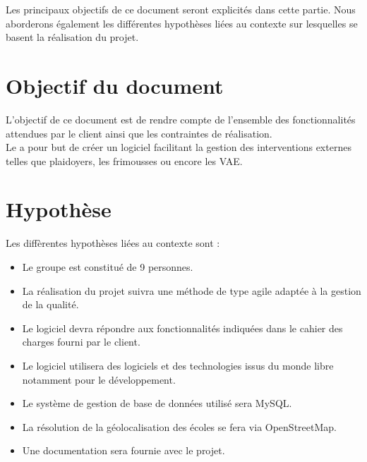 	Les principaux objectifs de ce document seront explicités dans cette partie. Nous aborderons également les différentes hypothèses liées au contexte sur lesquelles se basent la réalisation du projet.


\section{Objectif du document}
	L'objectif de ce document est de rendre compte de l'ensemble des fonctionnalités attendues par le client ainsi que les contraintes de réalisation. \\
	
	Le \PICCourt \nomClient{} a pour but de créer un logiciel facilitant la gestion des interventions externes telles que plaidoyers, les frimousses ou encore les VAE.
	
	
\section{Hypothèse}
	Les diffèrentes hypothèses liées au contexte sont :
	\begin{itemize}
		\item Le groupe \nomEquipe{} est constitué de 9 personnes.
		\item La réalisation du projet suivra une méthode de type agile adaptée à la gestion de la qualité.
		\item Le logiciel devra répondre aux fonctionnalités indiquées dans le cahier des charges fourni par le client.
		\item Le logiciel utilisera des logiciels et des technologies issus du monde libre notamment pour le développement.
		\item Le système de gestion de base de données utilisé sera MySQL.
		\item La résolution de la géolocalisation des écoles se fera via OpenStreetMap.
		\item Une documentation sera fournie avec le projet.
	\end{itemize}
	